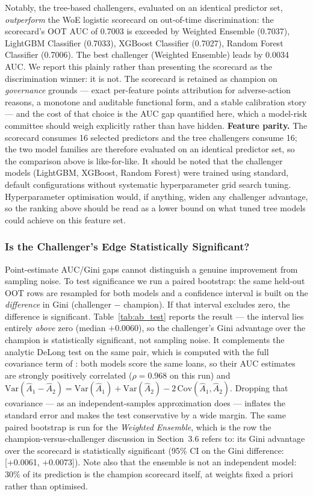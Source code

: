 \documentclass[11pt,a4paper]{article}
\begin{document}
Notably, the tree-based challengers, evaluated on an identical predictor set, \emph{outperform} the WoE logistic scorecard on out-of-time discrimination: the scorecard's OOT AUC of 0.7003 is exceeded by Weighted Ensemble (0.7037), LightGBM Classifier (0.7033), XGBoost Classifier (0.7027), Random Forest Classifier (0.7006). The best challenger (Weighted Ensemble) leads by 0.0034 AUC. We report this plainly rather than presenting the scorecard as the discrimination winner: it is not. The scorecard is retained as champion on \emph{governance} grounds --- exact per-feature points attribution for adverse-action reasons, a monotone and auditable functional form, and a stable calibration story --- and the cost of that choice is the AUC gap quantified here, which a model-risk committee should weigh explicitly rather than have hidden. \textbf{Feature parity.} The scorecard consumes 16 selected predictors and the tree challengers consume 16; the two model families are therefore evaluated on an identical predictor set, so the comparison above is like-for-like. It should be noted that the challenger models (LightGBM, XGBoost, Random Forest) were trained using standard, default configurations without systematic hyperparameter grid search tuning. Hyperparameter optimisation would, if anything, widen any challenger advantage, so the ranking above should be read as a lower bound on what tuned tree models could achieve on this feature set.

\subsubsection*{Is the Challenger's Edge Statistically Significant?}
Point-estimate AUC/Gini gaps cannot distinguish a genuine improvement from sampling noise. To test significance we run a paired bootstrap: the same held-out OOT rows are resampled for both models and a confidence interval is built on the \emph{difference} in Gini (challenger $-$ champion). If that interval excludes zero, the difference is significant. Table~\ref{tab:ab_test} reports the result --- the interval lies entirely \emph{above} zero (median $+0.0060$), so the challenger's Gini advantage over the champion is statistically significant, not sampling noise. It complements the analytic DeLong test on the same pair, which is computed with the full covariance term of \textcite{delong1988}: both models score the same loans, so their AUC estimates are strongly positively correlated ($\rho = 0.968$ on this run) and $\mathrm{Var}(\widehat{A}_1 - \widehat{A}_2) = \mathrm{Var}(\widehat{A}_1) + \mathrm{Var}(\widehat{A}_2) - 2\,\mathrm{Cov}(\widehat{A}_1, \widehat{A}_2)$. Dropping that covariance --- as an independent-samples approximation does --- inflates the standard error and makes the test conservative by a wide margin. The same paired bootstrap is run for the \emph{Weighted Ensemble}, which is the row the champion-versus-challenger discussion in Section~3.6 refers to: its Gini advantage over the scorecard is statistically significant (95\% CI on the Gini difference: [+0.0061, +0.0073]). Note also that the ensemble is not an independent model: 30\% of its prediction is the champion scorecard itself, at weights fixed a priori rather than optimised.
\end{document}
